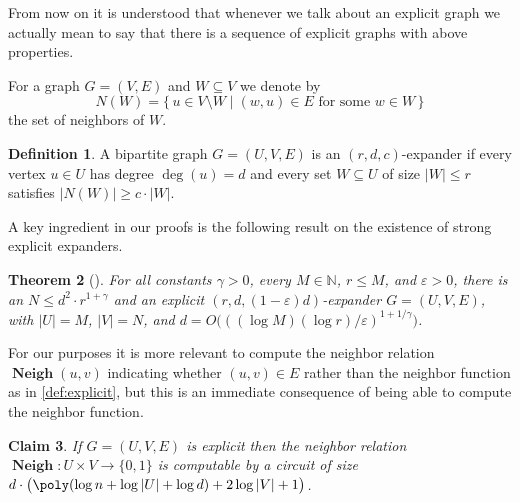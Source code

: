 \documentclass[10pt,a4paper]{article}
\theoremstyle{plain}
\newtheorem{theorem}{Theorem}[section]
\newtheorem{claim}[theorem]{Claim}
\theoremstyle{remark}
\theoremstyle{definition}
\newtheorem{definition}[theorem]{Definition}
\newcommand{\pa}[1]{}
\newcommand{\kr}[1]{}
\newcommand{\eps}{\varepsilon}
\newcommand{\setdescr}[2]{\{\,#1 \mid #2\,\}}
\newcommand{\N}{\mathbb{N}}
\DeclareMathOperator{\neigh}{\textbf{Neigh}}
\begin{document}
From now on it is understood that whenever we talk about an explicit
graph we actually mean to say that there is a sequence of explicit
graphs with above properties.

For a graph $G = (V, E)$ and $W \subseteq V$ we denote by
\[
  N(W) = \setdescr{u \in V \setminus W}{(w,u) \in E \text{ for some } w
    \in W}
\]
the set of neighbors of $W$.

\begin{definition}
  A bipartite graph $G = (U, V, E)$ is an $(r, d, c)$-expander if every
  vertex $u \in U$ has degree $\deg(u) = d$ and every set
  $W \subseteq U$ of size $|W| \le r$ satisfies $|N(W)| \ge c \cdot |W|$.
\end{definition}

A key ingredient in our proofs is the following result on the
existence of strong explicit expanders.

\begin{theorem}[\cite{GUV09Unbalanced}]\label{thm:expander}
  For all constants $\gamma > 0$,
  every $M \in \N$, $r \le M$,
  and $\eps > 0$,
  there is an
  $N \le d^2 \cdot r^{1 + \gamma}$ and an
  explicit
  $(r, d, (1- \eps)d)$-expander
  $G=(U, V, E)$,
  with $|U| = M$,
  $|V| = N$, and
  $d = O\big( ((\log M)(\log r) / \eps )^{1+1/\gamma}\big)$.
\end{theorem}

\kr{Igor pointed this out:
  \url{https://eccc.weizmann.ac.il/report/2018/159/}. Quickly checking
  the parameters I believe it does not give anything better. Need to
  check more carefully}

For our purposes it is more relevant to compute the neighbor relation
$\neigh(u,v)$ indicating whether $(u, v) \in E$ rather than the
neighbor function as in \cref{def:explicit}, but this is an immediate
consequence of being able to compute the neighbor function.

\begin{claim}
  \label{claim:explicit neigh}
  If $G = (U, V, E)$ is explicit then the neighbor relation
  $\neigh: U \times V \rightarrow \{0,1\}$ is computable by a circuit
  of size
  $d \cdot \big( \poly(\log n + \log |U| + \log d) + 2 \log |V| + 1
  \big)$.
\end{claim}


\end{document}
